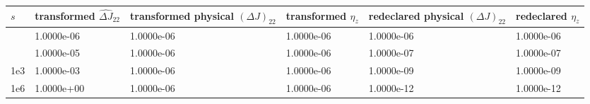 \begin{tabularx}{0.98\textwidth}{@{}>{\raggedright\arraybackslash}p{}XXXXX@{}}
\toprule
$s$ & transformed $\widehat{\Delta J}_{22}$ & transformed physical $(\Delta J)_{22}$ & transformed $\eta_z$ & redeclared physical $(\Delta J)_{22}$ & redeclared $\eta_z$ \\
\midrule
1 & 1.0000e-06 & 1.0000e-06 & 1.0000e-06 & 1.0000e-06 & 1.0000e-06 \\
10 & 1.0000e-05 & 1.0000e-06 & 1.0000e-06 & 1.0000e-07 & 1.0000e-07 \\
1e3 & 1.0000e-03 & 1.0000e-06 & 1.0000e-06 & 1.0000e-09 & 1.0000e-09 \\
1e6 & 1.0000e+00 & 1.0000e-06 & 1.0000e-06 & 1.0000e-12 & 1.0000e-12 \\
\bottomrule
\end{tabularx}
